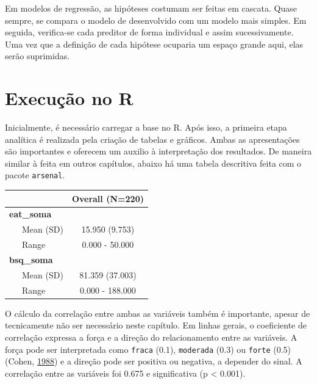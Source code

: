\documentclass[
]{book}
\newenvironment{Shaded}{\begin{snugshade}}{\end{snugshade}}
\newcommand{\KeywordTok}[1]{\textcolor[rgb]{0.13,0.29,0.53}{\textbf{#1}}}
\newcommand{\NormalTok}[1]{#1}
\newcommand{\OperatorTok}[1]{\textcolor[rgb]{0.81,0.36,0.00}{\textbf{#1}}}
\newcommand{\StringTok}[1]{\textcolor[rgb]{0.31,0.60,0.02}{#1}}
\begin{document}
Em modelos de regressão, as hipóteses costumam ser feitas em cascata.
Quase sempre, se compara o modelo de desenvolvido com um modelo mais
simples. Em seguida, verifica-se cada preditor de forma individual e
assim sucessivamente. Uma vez que a definição de cada hipótese ocuparia
um espaço grande aqui, elas serão suprimidas.

\hypertarget{execuuxe7uxe3o-no-r-13}{%
\section{Execução no R}\label{execuuxe7uxe3o-no-r-13}}

Inicialmente, é necessário carregar a base no R. Após isso, a primeira
etapa analítica é realizada pela criação de tabelas e gráficos. Ambas as
apresentações são importantes e oferecem um auxilio à interpretação dos
resultados. De maneira similar à feita em outros capítulos, abaixo há
uma tabela descritiva feita com o pacote \texttt{arsenal}.

\begin{Shaded}
\end{Shaded}

\begin{longtable}[]{@{}lc@{}}
\toprule
& Overall (N=220)\tabularnewline
\midrule
\endhead
\textbf{eat\_soma} &\tabularnewline
~~~Mean (SD) & 15.950 (9.753)\tabularnewline
~~~Range & 0.000 - 50.000\tabularnewline
\textbf{bsq\_soma} &\tabularnewline
~~~Mean (SD) & 81.359 (37.003)\tabularnewline
~~~Range & 0.000 - 188.000\tabularnewline
\bottomrule
\end{longtable}

O cálculo da correlação entre ambas as variáveis também é importante,
apesar de tecnicamente não ser necessário neste capítulo. Em linhas
gerais, o coeficiente de correlação expressa a força e a direção do
relacionamento entre as variáveis. A força pode ser interpretada como
\texttt{fraca} (0.1), \texttt{moderada} (0.3) ou \texttt{forte} (0.5)
(Cohen, \protect\hyperlink{ref-Cohen1988}{1988}) e a direção pode ser
positiva ou negativa, a depender do sinal. A correlação entre as
variáveis foi 0.675 e significativa (p \textless{} 0.001).
\end{document}
